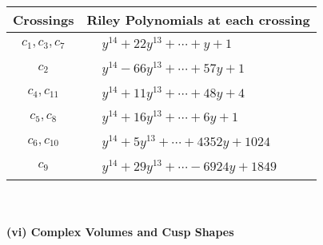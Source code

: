 \documentclass[1p]{elsarticle_modified}
\theoremstyle{definition}
\begin{document}
\begin{tabular}{m{50pt}|m{274pt}}
Crossings & \hspace{64pt}Riley Polynomials at each crossing \\
\hline $$\begin{aligned}c_{1},c_{3},c_{7}\end{aligned}$$&$\begin{aligned}
&y^{14}+22 y^{13}+\cdots+y+1
\end{aligned}$\\
\hline $$\begin{aligned}c_{2}\end{aligned}$$&$\begin{aligned}
&y^{14}-66 y^{13}+\cdots+57 y+1
\end{aligned}$\\
\hline $$\begin{aligned}c_{4},c_{11}\end{aligned}$$&$\begin{aligned}
&y^{14}+11 y^{13}+\cdots+48 y+4
\end{aligned}$\\
\hline $$\begin{aligned}c_{5},c_{8}\end{aligned}$$&$\begin{aligned}
&y^{14}+16 y^{13}+\cdots+6 y+1
\end{aligned}$\\
\hline $$\begin{aligned}c_{6},c_{10}\end{aligned}$$&$\begin{aligned}
&y^{14}+5 y^{13}+\cdots+4352 y+1024
\end{aligned}$\\
\hline $$\begin{aligned}c_{9}\end{aligned}$$&$\begin{aligned}
&y^{14}+29 y^{13}+\cdots-6924 y+1849
\end{aligned}$\\
\hline
\end{tabular}\\~\\
\newpage\flushleft \textbf{(vi) Complex Volumes and Cusp Shapes}
\end{document}
